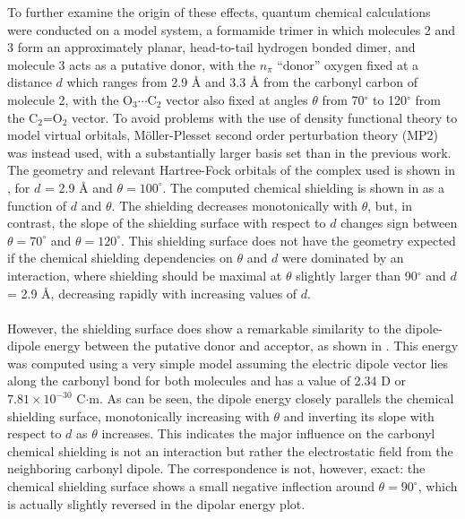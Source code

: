 \begin{doublespace}
To further examine the origin of these effects, quantum chemical calculations
were conducted on a model system, a formamide trimer in which molecules 2 and 3
form an approximately planar, head-to-tail hydrogen bonded dimer, and molecule
3 acts as a putative \npistar{} donor, with the $n_\pi$ ``donor'' oxygen fixed
at a distance $d$ which ranges from 2.9 \r{A} and 3.3 \r{A} from the carbonyl
carbon of molecule 2, with the O$_3\cdots$C$_2$ vector also fixed at angles
$\theta$ from 70$^\circ$ to 120$^\circ$ from the C$_2$=O$_2$ vector. To avoid
problems with the use of density functional theory to model virtual
orbitals, M\"{o}ller-Plesset second order perturbation theory (MP2) was
instead used, with a substantially larger basis set than in the previous work.
The geometry and relevant Hartree-Fock orbitals of the complex used is shown
in , for $d$ = 2.9 \r{A} and $\theta = 100^\circ$.
The computed chemical shielding is shown in 
as a function of $d$ and $\theta$. The shielding decreases monotonically
with $\theta$, but, in contrast, the slope of the shielding surface with
respect to $d$ changes sign between
$\theta = 70^\circ$ and $\theta = 120^\circ$. This shielding surface does not
have the geometry expected if the chemical shielding dependencies on $\theta$
and $d$ were dominated by an \npipistar{} interaction, where shielding should
be maximal at $\theta$ slightly larger than 90$^\circ$ and $d$ = 2.9 \r{A},
decreasing rapidly with increasing values of $d$.
\\\\
However, the shielding surface does show a remarkable similarity to the
dipole-dipole energy between the putative donor and acceptor, as shown in
. This energy was computed using a very simple
model assuming the electric dipole vector lies along the carbonyl bond for
both molecules and has a value of 2.34 D or $7.81 \times 10^{-30}$ C$\cdot$m.
As can be seen, the dipole energy closely parallels the chemical shielding
surface, monotonically increasing with $\theta$ and inverting its slope with
respect to $d$ as $\theta$ increases. This indicates the major influence on
the carbonyl \cnmr{} chemical shielding is not an \npipistar{} interaction
but rather the electrostatic field from the neighboring carbonyl dipole.
The correspondence is not, however, exact: the chemical shielding surface
shows a small negative inflection around $\theta = 90^\circ$, which is
actually slightly reversed in the dipolar energy plot.
\end{doublespace}

